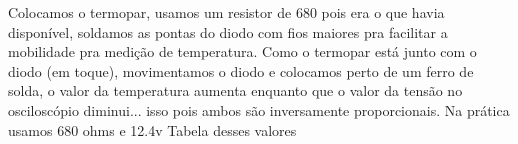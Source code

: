 \documentclass{article}
\begin{document}
Colocamos o termopar, usamos um resistor de 680 pois era o que havia disponível, soldamos as pontas do diodo com fios maiores pra facilitar a mobilidade pra medição de temperatura. Como o termopar está junto com o diodo (em toque), movimentamos o diodo e colocamos perto de um ferro de solda, o valor da temperatura aumenta enquanto que o valor da tensão no osciloscópio diminui... isso pois ambos são inversamente proporcionais.
Na prática usamos 680 ohms e 12.4v
Tabela desses valores
\end{document}
